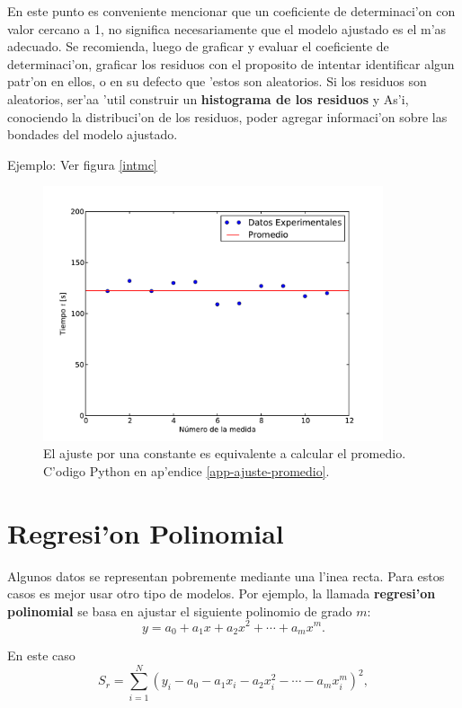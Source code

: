 \documentclass[a4paper]{report}
\begin{document}
En este punto es conveniente mencionar que un coeficiente de determinaci'on con valor cercano a 1, no significa necesariamente que el modelo ajustado es el m'as adecuado. Se recomienda, luego de graficar y evaluar el coeficiente de determinaci'on, graficar los residuos con el proposito de intentar identificar algun patr'on en ellos, o en su defecto que 'estos son aleatorios. Si los residuos son aleatorios, ser'aa 'util construir un \textbf{histograma de los residuos} y As'i, conociendo la distribuci'on de los residuos, poder agregar informaci'on sobre las bondades del modelo ajustado.

Ejemplo: Ver figura \ref{intmc}


\begin{figure}[h!]
\begin{center}
\includegraphics[width=10cm]{figs/fig-ajuste-promedio.pdf}
\caption{El ajuste por una constante es equivalente a calcular el promedio. C'odigo Python en ap'endice \ref{app-ajuste-promedio}.}
\end{center}
\end{figure}

\section{Regresi'on Polinomial}

Algunos datos se representan pobremente mediante una l'inea recta. Para estos casos es mejor usar otro tipo de modelos. Por ejemplo, la llamada \textbf{regresi'on polinomial} se basa en ajustar el siguiente polinomio de grado $m$:
\begin{equation}
y=a_0+a_1x+a_2x^2+\cdots + a_mx^m.
\end{equation}

En este caso
\begin{equation}\label{Srpol}
S_{r}=\sum_{i=1}^N\left(y_i-a_0-a_1x_i-a_2x_i^2-\cdots - a_mx_i^m\right)^2,
\end{equation}
\end{document}
